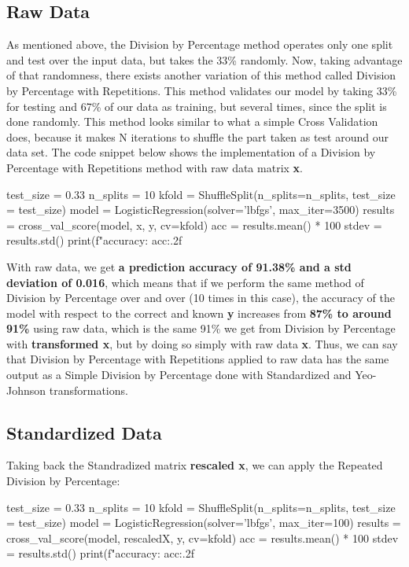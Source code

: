 \documentclass[11pt]{article}
\begin{document}
\subsection{Raw Data}

As mentioned above, the Division by Percentage method operates only one split and test over the input data, but takes the 33\% randomly. Now, taking advantage of that randomness, there exists another variation of this method called Division by Percentage with Repetitions. This method validates our model by taking 33\% for testing and 67\% of our data as training, but several times, since the split is done randomly. This method looks similar to what a simple Cross Validation does, because it makes N iterations to shuffle the part taken as test around our data set. The code snippet below shows the implementation of a Division by Percentage with Repetitions method with raw data matrix \textbf{x}.

\begin{python}
test_size = 0.33
n_splits = 10
kfold = ShuffleSplit(n_splits=n_splits, test_size = test_size)
model = LogisticRegression(solver='lbfgs', max_iter=3500)
results = cross_val_score(model, x, y, cv=kfold)
acc = results.mean() * 100
stdev = results.std()
print(f"accuracy: {acc:.2f}%
\end{python}

With raw data, we get \textbf{a prediction accuracy of 91.38\% and a std deviation of 0.016}, which means that if we perform the same method of Division by Percentage over and over (10 times in this case), the accuracy of the model with respect to the correct and known \textbf{y} increases from \textbf{87\% to around 91\%} using raw data, which is the same 91\% we get from Division by Percentage with \textbf{transformed x}, but by doing so simply with raw data \textbf{x}. Thus, we can say that Division by Percentage with Repetitions applied to raw data has the same output as a Simple Division by Percentage done with Standardized and Yeo-Johnson transformations.

\subsection{Standardized Data}

Taking back the Standradized matrix \textbf{rescaled x}, we can apply the Repeated Division by Percentage:
\\

\begin{python}
test_size = 0.33
n_splits = 10
kfold = ShuffleSplit(n_splits=n_splits, test_size = test_size)
model = LogisticRegression(solver='lbfgs', max_iter=100)
results = cross_val_score(model, rescaledX, y, cv=kfold)
acc = results.mean() * 100
stdev = results.std()
print(f"accuracy: {acc:.2f}%
\end{python}
\end{document}
